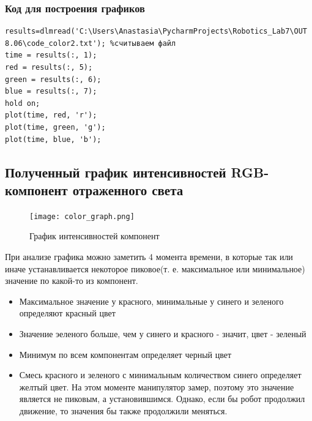 \documentclass{article}
\begin{document}
\subsubsection*{Код для построения графиков}
\begin{verbatim}
results=dlmread('C:\Users\Anastasia\PycharmProjects\Robotics_Lab7\OUT 8.06\code_color2.txt'); %считываем файл
time = results(:, 1);
red = results(:, 5);
green = results(:, 6);
blue = results(:, 7);
hold on;
plot(time, red, 'r');
plot(time, green, 'g');
plot(time, blue, 'b');
\end{verbatim}

\subsection{Полученный график интенсивностей RGB-компонент отраженного света}
\begin{figure}[h]
    \centering
    \texttt{[image: color\_graph.png]}
    \caption{График интенсивностей компонент}
\end{figure}

\par При анализе графика можно заметить 4 момента времени, в которые так или иначе устанавливается некоторое пиковое(т. е. максимальное или минимальное) значение по какой-то из компонент.
\begin{itemize}
\item Максимальное значение у красного, минимальные у синего и зеленого определяют красный цвет
\item Значение эеленого больше, чем у синего и красного - значит, цвет - зеленый
\item Минимум по всем компонентам определяет черный цвет
\item Смесь красного и зеленого с минимальным количеством синего определяет желтый цвет. На этом моменте манипулятор замер, поэтому это значение является не пиковым, а установившимся. Однако, если бы робот продолжил движение, то значения бы также продолжили меняться.
\end{itemize}
\end{document}
